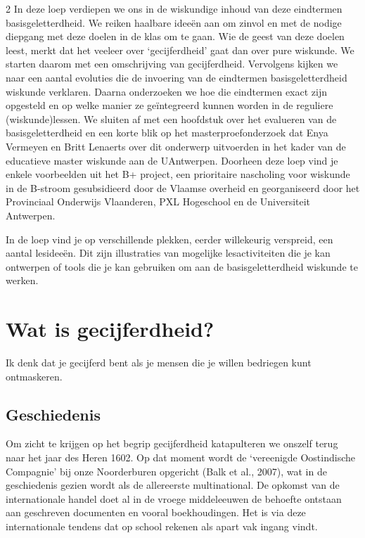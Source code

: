 \begin{multicols}{2}
In deze loep verdiepen we ons in de wiskundige inhoud van deze eindtermen basisgeletterdheid. We reiken haalbare ideeën aan om zinvol en met de nodige diepgang met deze doelen in de klas om te gaan. Wie de geest van deze doelen leest, merkt dat het veeleer over `gecijferdheid' gaat dan over pure wiskunde. We starten daarom met een omschrijving van gecijferdheid. Vervolgens kijken we naar een aantal evoluties die de invoering van de eindtermen basisgeletterdheid wiskunde verklaren. Daarna onderzoeken we hoe die eindtermen exact zijn opgesteld en op welke manier ze geïntegreerd kunnen worden in de reguliere (wiskunde)lessen. We sluiten af met een hoofdstuk over het evalueren van de basisgeletterdheid en een korte blik op het masterproefonderzoek dat Enya Vermeyen en Britt Lenaerts over dit onderwerp uitvoerden in het kader van de educatieve master wiskunde aan de UAntwerpen. Doorheen deze loep vind je enkele voorbeelden uit het B+ project, een prioritaire nascholing voor wiskunde in de B-stroom gesubsidieerd door de Vlaamse overheid en georganiseerd door het Provinciaal Onderwijs Vlaanderen, PXL Hogeschool en de Universiteit Antwerpen.

In de loep vind je op verschillende plekken, eerder willekeurig verspreid, een aantal lesideeën. Dit zijn illustraties van mogelijke lesactiviteiten die je kan ontwerpen of tools die je kan gebruiken om aan de basisgeletterdheid wiskunde te werken. 

\section{Wat is gecijferdheid?}
	\begin{citaat} %
		Ik denk dat je gecijferd bent als je mensen die je willen
bedriegen kunt ontmaskeren.
	\end{citaat}
\subsection{Geschiedenis}
Om zicht te krijgen op  het begrip gecijferdheid katapulteren we onszelf terug naar het jaar des Heren 1602. Op dat moment wordt de `vereenigde Oostindische Compagnie' bij onze Noorderburen opgericht (Balk et al., 2007), wat in de geschiedenis gezien wordt als de allereerste multinational. De opkomst van de internationale handel doet al in de vroege middeleeuwen de behoefte ontstaan aan geschreven documenten en vooral boekhoudingen. Het is via deze internationale tendens dat op school rekenen als apart vak ingang vindt. 


\end{multicols}
